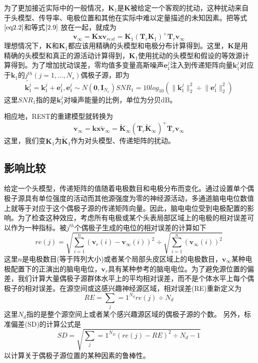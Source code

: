 为了更加接近实际中的一般情况，$\mathbf{K}_1$是$\mathbf{K}$被给定一个客观的扰动，这种扰动来自于头模型、传导率、电极位置和其他在实际中难以定量描述的未知因素。把等式$\eqref{eq2.2}$和等式$\eqref{2.9}$
放在一起，就成为
\begin{equation*}
\mathbf{v}_{\infty}=\mathbf{Kx}
\mathbf{v}_{rest}=\mathbf{K}_1(\mathbf{T}_r\mathbf{K}_1)^{+}\mathbf{T}_{r}\mathbf{v}_{\infty}
\end{equation*}
理想情况下，$\mathbf{K}$和$\mathbf{K}_1$都应该用精确的头模型和电极分布计算得到。这里，$\mathbf{K}$是用精确的头模型和真正的源活动计算得到，$\mathbf{K}_1$使用扰动的头模型和假设的等效源计算得到。为了增加扰动误差，零均值多变量高斯噪声$\mathbf{e}_1^j$注入到传递矩阵向量$\mathbf{k}_1^j$对应于$\mathbf{k}_1$的$j^{th}(j=1,...,N_s)$偶极子源，即为
\begin{equation*}
\tilde{\mathbf{k}_1^j}=\mathbf{k}_1^j+\mathbf{e}_1^j,\mathbf{e}_1^j\sim{N(\mathbf{0},\mathbf{I}_{N_e})}
SNR_1=10log_10(\lVert\mathbf{k}_1^{j}\rVert_2^2\div{\lVert\mathbf{e}_1^{j}\rVert_2^2})
\end{equation*}
这里$SNR_1$指的是$\mathbf{k}_1^j$对噪声能量的比例，单位为分贝dB。

相应地，REST的重建模型就转换为
\begin{equation}\label{2.9}
\mathbf{v}_{\infty}=\mathbf{kx}
\tilde{\mathbf{v}}_{\infty}=\tilde{\mathbf{K}}_{\infty}(\mathbf{T}_{r}\tilde{\mathbf{K}}_{\infty})^{+}\mathbf{T}_{r}\mathbf{v}_{\infty}
\end{equation}
这里，我们变$\mathbf{K}_1$为$\tilde{\mathbf{K}}_1$作为对头模型、传递矩阵的扰动。

\subsection{影响比较}
给定一个头模型，传递矩阵的值随着电极数目和电极分布而变化。通过设置单个偶极子源具有单位强度的活动而其他源强度为零的神经源活动，多通道脑电电位数值上就等于对应于这个偶极子源的传递矩阵向量。因此，脑电电位受到电极配置的影响。为了检查这种效应，考虑所有电极或某个头表局部区域上的电极的相对误差可以作为一种指标。被$j^{th}$个偶极子生成的电位的相对误差的计算如下
\begin{equation*}
re(j)=\sqrt{\sum_{i=1}^n(\mathbf{v}_r(i)-\mathbf{v}_{\infty}(i))^2}\div\sqrt{\sum_{i=1}^n(\mathbf{v}_{\infty}(i))^2}
\end{equation*}
这里$n$是电极数目(等于阵列大小)或者某个局部头皮区域上的电极数目，$\mathbf{v}_{\infty}$某种电极配置下的正演出的脑电电位，$\mathbf{v}_r$具有某种参考的脑电电位。为了避免源位置的偏差，我们计算大量偶极子源群体水平上的平均相对误差，而不是个体水平上每个偶极子的相对误差。在源空间或这感兴趣神经源区域，相对误差(RE)重新定义为
\begin{equation*}
RE=\sum_j=1^{N_d}re(j)\div{N_d}
\end{equation*}
这里$N_d$指的是整个源空间上或者某个感兴趣源区域的偶极子源的个数。 另外，标准偏差(SD)的计算公式是
\begin{equation*}
SD=\sqrt{\sum_j=1^{N_D}(re(j)-RE)^2\div{N_d-1}}
\end{equation*}
以计算关于偶极子源位置的某种因素的鲁棒性。

